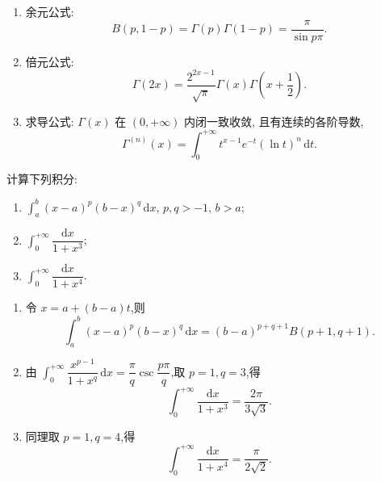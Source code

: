 \begin{proposition}[\markstar]
\begin{enumerate}
        \item 余元公式:
              \[
                  B(p,1-p)=\Gamma(p)\Gamma(1-p)=\dfrac{\pi}{\sin p\pi}.
              \]

        \item 倍元公式:
              \[
                  \Gamma(2x)=\dfrac{2^{2x-1}}{\sqrt{\pi}}\Gamma(x)\Gamma\left(x+\dfrac{1}{2}\right).
              \]

        \item 求导公式: $\Gamma(x)$ 在 $(0,+\infty)$ 内闭一致收敛, 且有连续的各阶导数,
              \[
                  \Gamma^{(n)}(x)=\int_0^{+\infty}t^{x-1}e^{-t}(\ln t)^n\,\mathrm{d}t.
              \]
    \end{enumerate}
\end{proposition}

\begin{example}
    计算下列积分:
    \begin{enumerate}
        \item $\displaystyle\int_a^b(x-a)^p(b-x)^q\,\mathrm{d}x$, $p,q>-1$, $b>a$;
        \item $\displaystyle\int_0^{+\infty}\dfrac{\mathrm{d}x}{1+x^3}$;
        \item $\displaystyle\int_0^{+\infty}\dfrac{\mathrm{d}x}{1+x^4}$.
    \end{enumerate}
\end{example}
\exampleblank

\begin{solution}
    \begin{enumerate}
        \item 令 $x=a+(b-a)t$,则
              \[
                  \int_a^b(x-a)^p(b-x)^q\,\mathrm{d}x
                  =(b-a)^{p+q+1}B(p+1,q+1).
              \]
        \item 由 $\displaystyle\int_0^{+\infty}\dfrac{x^{p-1}}{1+x^q}\,\mathrm{d}x
                  =\dfrac{\pi}{q}\csc\dfrac{p\pi}{q}$,取 $p=1,q=3$,得
              \[
                  \int_0^{+\infty}\dfrac{\mathrm{d}x}{1+x^3}
                  =\dfrac{2\pi}{3\sqrt3}.
              \]
        \item 同理取 $p=1,q=4$,得
              \[
                  \int_0^{+\infty}\dfrac{\mathrm{d}x}{1+x^4}
                  =\dfrac{\pi}{2\sqrt2}.
              \]
    \end{enumerate}
\end{solution}

